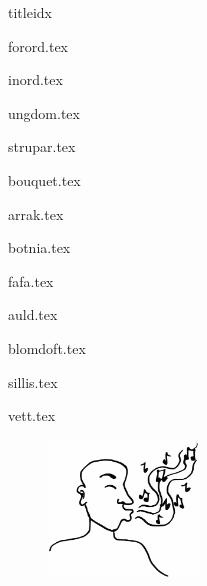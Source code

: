 \documentclass[a6paper,8pt,makeidx]{book}
\begin{document}
\begin{songs}{titleidx}

{forord.tex}
\sclearpage

{inord.tex}
\sclearpage

{ungdom.tex}
\sclearpage

{strupar.tex}	
\sclearpage

{bouquet.tex}	
\sclearpage

{arrak.tex}	
\sclearpage

{botnia.tex}	
\sclearpage

{fafa.tex}	
\sclearpage

{auld.tex}	
\sclearpage

{blomdoft.tex}
\sclearpage

{sillis.tex}
\sclearpage

{vett.tex}
\sclearpage


\end{songs}
\begin{figure}[h]
	\begin{center}
		\includegraphics[width=40mm]{./bilder/fardigabilder/BilderTillKapitel/visslaren.png} 
	\end{center}
\end{figure}
\renewcommand{\idxtitlefont}{\rmfamily\mdseries}
\renewcommand{\idxlyricfont}{\rmfamily\mdseries}
\renewcommand{\idxheadfont}{\sffamily\it\large}
\setlength{\idxheadwidth}{0.5cm}
\end{document}
